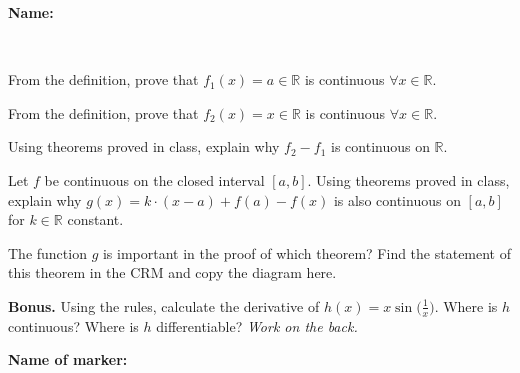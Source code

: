 \documentclass[9pt]{exam}
\begin{document}
\textbf{Name:} \dotfill

\

\begin{questions}

\question[2] From the definition, prove that $f_1(x) = a \in \mathbb{R}$ is continuous $\forall x \in \mathbb{R}$.
\fillwithdottedlines{20mm}

\question[2] From the definition, prove that $f_2(x) = x \in \mathbb{R}$ is continuous $\forall x \in \mathbb{R}$.
\fillwithdottedlines{20mm}


\question[2] Using theorems proved in class, explain why $f_2 - f_1$ is continuous on $\mathbb{R}$.
\fillwithdottedlines{20mm}

\question[2] Let $f$ be continuous on the closed interval $[a, b]$. Using theorems proved in class, explain why $g(x) = k \cdot (x - a) + f(a) - f(x)$ is also continuous on $[a, b]$ for $k \in \mathbb{R}$ constant.
\fillwithdottedlines{20mm}

\question[3] The function $g$ is important in the proof of which theorem? \newline
Find the statement of this theorem in the CRM and copy the diagram here.


\vfill

\question[0] \textbf{Bonus.} Using the rules, calculate the derivative of $h(x) = x \sin \big(\frac{1}{x}\big)$. \newline
Where is $h$ continuous? Where is $h$ differentiable? \hfill \emph{Work on the back.}

\end{questions}


\begin{tcolorbox}

\textbf{Name of marker:}

\begin{center}
\gradetable[h][questions]
\end{center}

\end{tcolorbox}
\end{document}
